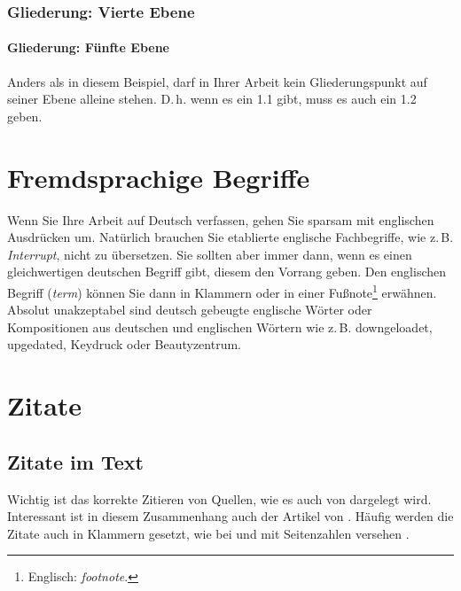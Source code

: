 \label{Gliederung:EbeneDrei}


\subsubsection{Gliederung: Vierte Ebene}

\paragraph{Gliederung: Fünfte Ebene} Anders als in diesem Beispiel, darf in Ihrer Arbeit kein Gliederungspunkt auf seiner Ebene alleine stehen. D.\,h. wenn es ein 1.1 gibt, muss es auch ein 1.2 geben.


\section{Fremdsprachige Begriffe}

Wenn Sie Ihre Arbeit auf Deutsch verfassen, gehen Sie sparsam mit englischen Ausdrücken um. Natürlich brauchen Sie etablierte englische Fachbegriffe, wie z.\,B. \textit{Interrupt}, nicht zu übersetzen. Sie sollten aber immer dann, wenn es einen gleichwertigen deutschen Begriff gibt, diesem den Vorrang geben. Den englischen Begriff (\textit{term}) können Sie dann in Klammern oder in einer Fußnote\footnote{Englisch: \textit{footnote}.} erwähnen. Absolut unakzeptabel sind deutsch gebeugte englische Wörter oder Kompositionen aus deutschen und englischen Wörtern wie z.\,B. downgeloadet, upgedated, Keydruck oder Beautyzentrum.


\section{Zitate}

\subsection{Zitate im Text}

Wichtig ist das korrekte Zitieren von Quellen, wie es auch von \cite{Kornmeier2011} dargelegt wird. Interessant ist in diesem Zusammenhang auch der Artikel von \cite{Kramer2009}. Häufig werden die Zitate auch in Klammern gesetzt, wie bei \parencite{Kornmeier2011} und mit Seitenzahlen versehen \parencite[S. 22--24]{Kornmeier2011}.

